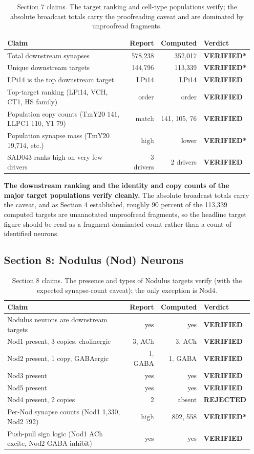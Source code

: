 \documentclass[11pt]{article}
\newcommand{\key}[1]{\textbf{#1}}
\newcommand{\Verify}{\textcolor{vgreen}{\textbf{VERIFIED}}}
\newcommand{\Caveat}{\textcolor{vamber}{\textbf{VERIFIED*}}}
\newcommand{\Reject}{\textcolor{vred}{\textbf{REJECTED}}}
\begin{document}
\begin{table}[H]
\centering
\caption{Section 7 claims. The target ranking and cell-type populations verify; the
absolute broadcast totals carry the proofreading caveat and are dominated by unproofread
fragments.}
\begin{tabular}{p{6.6cm}rrl}
\toprule
Claim & Report & Computed & Verdict \\
\midrule
Total downstream synapses & 578{,}238 & 352{,}017 & \Caveat \\
Unique downstream targets & 144{,}796 & 113{,}339 & \Caveat \\
LPi14 is the top downstream target & LPi14 & LPi14 & \Verify \\
Top-target ranking (LPi14, VCH, CT1, HS family) & order & order & \Verify \\
Population copy counts (TmY20 141, LLPC1 110, Y1 79) & match & 141, 105, 76 & \Verify \\
Population synapse mass (TmY20 19{,}714, etc.) & high & lower & \Caveat \\
SAD043 ranks high on very few drivers & 3 drivers & 2 drivers & \Verify \\
\bottomrule
\end{tabular}
\end{table}

\key{The downstream ranking and the identity and copy counts of the major target
populations verify cleanly.} The absolute broadcast totals carry the caveat, and as
Section 4 established, roughly 90 percent of the 113{,}339 computed targets are
unannotated unproofread fragments, so the headline target figure should be read as a
fragment-dominated count rather than a count of identified neurons.

\subsection*{Section 8: Nodulus (Nod) Neurons}

\begin{table}[H]
\centering
\caption{Section 8 claims. The presence and types of Nodulus targets verify (with the
expected synapse-count caveat); the only exception is Nod4.}
\begin{tabular}{p{6.6cm}rrl}
\toprule
Claim & Report & Computed & Verdict \\
\midrule
Nodulus neurons are downstream targets & yes & yes & \Verify \\
Nod1 present, 3 copies, cholinergic & 3, ACh & 3, ACh & \Verify \\
Nod2 present, 1 copy, GABAergic & 1, GABA & 1, GABA & \Verify \\
Nod3 present & yes & yes & \Verify \\
Nod5 present & yes & yes & \Verify \\
Nod4 present, 2 copies & 2 & absent & \Reject \\
Per-Nod synapse counts (Nod1 1{,}330, Nod2 792) & high & 892, 558 & \Caveat \\
Push-pull sign logic (Nod1 ACh excite, Nod2 GABA inhibit) & yes & yes & \Verify \\
\bottomrule
\end{tabular}
\end{table}
\end{document}
